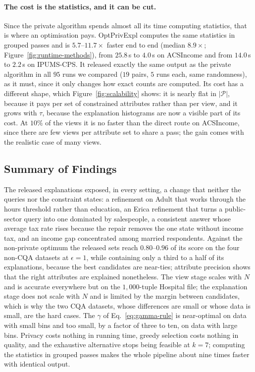 \paragraph{The cost is the statistics, and it can be cut.}
Since the private algorithm spends almost all its time computing statistics, that is where an optimisation pays.
\textsf{OptPrivExpl} computes the same statistics in grouped passes and is $5.7$--$11.7\times$ faster end to end (median $8.9\times$; Figure~\ref{fig:runtime-methods}), from $25.8$\,s to $4.0$\,s on ACSIncome and from $14.0$\,s to $2.2$\,s on IPUMS-CPS.
It released exactly the same output as the private algorithm in all $95$ runs we compared ($19$ pairs, $5$ runs each, same randomness), as it must, since it only changes how exact counts are computed.
Its cost has a different shape, which Figure~\ref{fig:scalability} shows: it is nearly flat in $|\mathcal{P}|$, because it pays per set of constrained attributes rather than per view, and it grows with $\tau$, because the explanation histograms are now a visible part of its cost.
At $10\%$ of the views it is no faster than the direct route on ACSIncome, since there are few views per attribute set to share a pass; the gain comes with the realistic case of many views.

\subsection{Summary of Findings}
\label{subsec:experiments-summary}

The released explanations exposed, in every setting, a change that neither the queries nor the constraint states: a refinement on Adult that works through the hours threshold rather than education, an Erica refinement that turns a public-sector query into one dominated by salespeople, a consistent answer whose average tax rate rises because the repair removes the one state without income tax, and an income gap concentrated among married respondents.
Against the non-private optimum the released sets reach $0.80$--$0.96$ of its score on the four non-CQA datasets at $\epsilon=1$, while containing only a third to a half of its explanations, because the best candidates are near-ties; attribute precision shows that the right attributes are explained nonetheless.
The view stage scales with $N$ and is accurate everywhere but on the $1{,}000$-tuple Hospital file; the explanation stage does not scale with $N$ and is limited by the margin between candidates, which is why the two CQA datasets, whose differences are small or whose data is small, are the hard cases.
The $\gamma$ of Eq.~\eqref{eq:gamma-rule} is near-optimal on data with small bins and too small, by a factor of three to ten, on data with large bins.
Privacy costs nothing in running time, greedy selection costs nothing in quality, and the exhaustive alternative stops being feasible at $k=7$; computing the statistics in grouped passes makes the whole pipeline about nine times faster with identical output.
